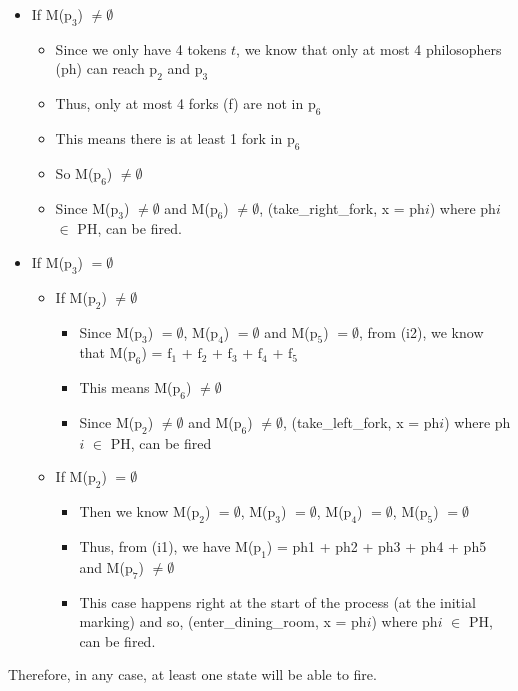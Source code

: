 \documentclass{article}
\begin{document}
\begin{itemize}
  \item If M($\text{p}_3$) $\neq \emptyset$
        \begin{itemize}
          \item Since we only have 4 tokens $t$, we know that only at most 4
                philosophers (ph) can reach $\text{p}_2$ and $\text{p}_3$
          \item Thus, only at most 4 forks (f) are not in $\text{p}_6$
          \item This means there is at least 1 fork in $\text{p}_6$
          \item So M($\text{p}_6$) $\neq \emptyset$
          \item Since M($\text{p}_3$) $\neq \emptyset$ and M($\text{p}_6$) $\neq
                \emptyset$, (take\_right\_fork, x = ph$i$) where ph$i$ $\in$ PH,
                can be fired.
        \end{itemize}
  \item If M($\text{p}_3$) $= \emptyset$
        \begin{itemize}
          \item If M($\text{p}_2$) $\neq \emptyset$
                \begin{itemize}
                  \item Since M($\text{p}_3$) $= \emptyset$, M($\text{p}_4$) $=
                        \emptyset$ and M($\text{p}_5$) $= \emptyset$, from (i2),
                        we know that M($\text{p}_6$) = $\text{f}_1$ +
                        $\text{f}_2$ + $\text{f}_3$ + $\text{f}_4$ +
                        $\text{f}_5$
                  \item This means M($\text{p}_6$) $\neq \emptyset$
                  \item Since M($\text{p}_2$) $\neq \emptyset$ and
                        M($\text{p}_6$) $\neq \emptyset$, (take\_left\_fork, x =
                        ph$i$) where ph$i$ $\in$ PH, can be fired
                \end{itemize}
          \item If M($\text{p}_2$) $= \emptyset$
                \begin{itemize}
                  \item Then we know M($\text{p}_2$) $= \emptyset$,
                        M($\text{p}_3$) $= \emptyset$, M($\text{p}_4$) $=
                        \emptyset$, M($\text{p}_5$) $= \emptyset$
                  \item Thus, from (i1), we have M($\text{p}_1$) = ph1 + ph2 +
                        ph3 + ph4 + ph5 and M($\text{p}_7$) $\neq \emptyset$
                  \item This case happens right at the start of the process (at
                        the initial marking) and so, (enter\_dining\_room, x =
                        ph$i$) where ph$i$ $\in$ PH, can be fired.
                \end{itemize}
        \end{itemize}
\end{itemize}
Therefore, in any case, at least one state will be able to fire.


\end{document}
